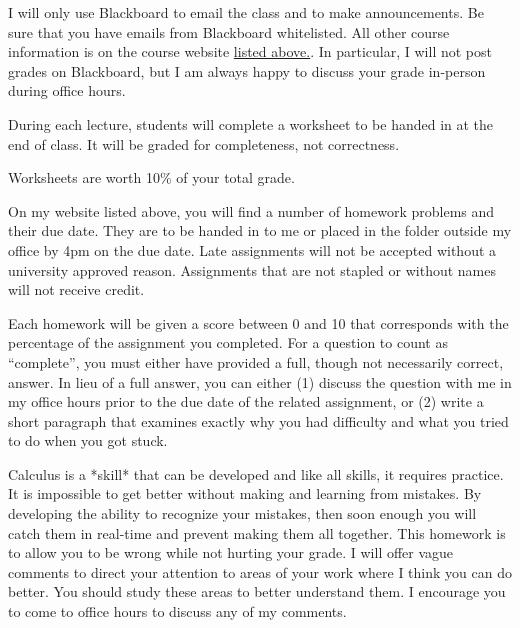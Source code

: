 \documentclass{assets/syllabus}
\begin{document}

I will only use Blackboard to email the class and
to make announcements.  Be sure that you have
emails from Blackboard whitelisted. All other
course information is on the course website
\href{https://danielmichaelcicala.github.io/teaching}{listed
  above.}.  In particular, I will not post grades
on Blackboard, but I am always happy to discuss
your grade in-person during office hours.


During each lecture, students will complete a
worksheet to be handed in at the end of class.  It
will be graded for completeness, not correctness. 

Worksheets are worth 10\% of your total grade.


On my website listed above, you will find a number
of homework problems and their due date. They are
to be handed in to me or placed in the folder
outside my office by 4pm on the due date. Late
assignments will not be accepted without a
university approved reason. Assignments that are
not stapled or without names will not receive
credit.

Each homework will be given a score between 0 and
10 that corresponds with the percentage of the
assignment you completed. For a question to count
as ``complete'', you must either have provided a
full, though not necessarily correct, answer. In
lieu of a full answer, you can either (1) discuss
the question with me in my office hours prior to
the due date of the related assignment, or (2)
write a short paragraph that examines exactly why
you had difficulty and what you tried to do when
you got stuck.

Calculus is a *skill* that can be developed and
like all skills, it requires practice.  It is
impossible to get better without making and
learning from mistakes.  By developing the ability
to recognize your mistakes, then soon enough you
will catch them in real-time and prevent making
them all together. This homework is to allow you
to be wrong while not hurting your grade.  I will
offer vague comments to direct your attention to
areas of your work where I think you can do
better. You should study these areas to better
understand them. I encourage you to come to office
hours to discuss any of my comments.
\end{document}
